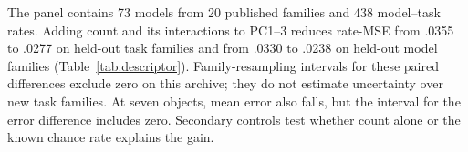The panel contains 73 models from 20 published families and 438 model--task rates. Adding count and its interactions to PC1--3 reduces rate-MSE from .0355 to .0277 on held-out task families and from .0330 to .0238 on held-out model families (Table~\ref{tab:descriptor}). Family-resampling intervals for these paired differences exclude zero on this archive; they do not estimate uncertainty over new task families. At seven objects, mean error also falls, but the interval for the error difference includes zero. Secondary controls test whether count alone or the known chance rate explains the gain.

